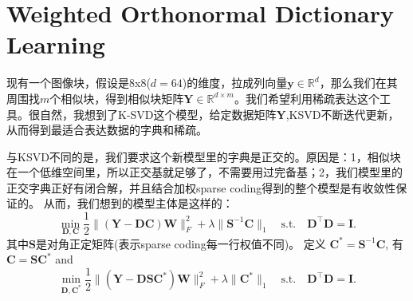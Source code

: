 \documentclass[10pt,twocolumn,letterpaper]{article}
\begin{document}
\section{Weighted Orthonormal Dictionary Learning}
现有一个图像块，假设是8x8($d=64$)的维度，拉成列向量$\mathbf{y}\in\mathbb{R}^{d}$，那么我们在其周围找$m$个相似块，得到相似块矩阵$\mathbf{Y}\in\mathbb{R}^{d\times m}$。我们希望利用稀疏表达这个工具。很自然，我想到了K-SVD这个模型，给定数据矩阵$\mathbf{Y}$,KSVD不断迭代更新，从而得到最适合表达数据的字典和稀疏。

与KSVD不同的是，我们要求这个新模型里的字典是正交的。原因是：1，相似块在一个低维空间里，所以正交基就足够了，不需要用过完备基；2，我们模型里的正交字典正好有闭合解，并且结合加权sparse coding得到的整个模型是有收敛性保证的。
从而，我们想到的模型主体是这样的：
\begin{equation}
\min_{\mathbf{D},\mathbf{C}}\frac{1}{2}\|(\mathbf{Y}-\mathbf{D}\mathbf{C})\mathbf{W}\|_{F}^{2}
+
\lambda\|\mathbf{S}^{-1}\mathbf{C}\|_{1}
\quad
\text{s.t.}
\quad
\mathbf{D}^{\top}\mathbf{D} =\mathbf{I}. 
\end{equation}
其中$\mathbf{S}$是对角正定矩阵(表示sparse coding每一行权值不同)。
定义 $\mathbf{C}^{*}=\mathbf{S}^{-1}\mathbf{C}$, 有$\mathbf{C}=\mathbf{S}\mathbf{C}^{*}$ and 
\begin{equation}
\min_{\mathbf{D},\mathbf{C}^{*}}\frac{1}{2}\|(\mathbf{Y}-\mathbf{D}\mathbf{S}\mathbf{C}^{*})\mathbf{W}\|_{F}^{2} 
+
\lambda\|\mathbf{C}^{*}\|_{1}
\quad
\text{s.t.}
\quad
\mathbf{D}^{\top}\mathbf{D} = \mathbf{I}.
\end{equation}
\end{document}
